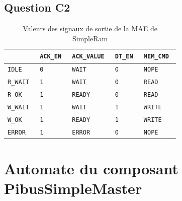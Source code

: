 \documentclass{article}
\begin{document}
\subsection{Question C2}

\begin{table}[!htb]
\centering
\begingroup
\setlength{\tabcolsep}{5pt}
\renewcommand{\arraystretch}{1.1}
\begin{tabular}{| l | l | l | l | l |}
\hline
                    & \tt{ACK\_EN}      & \tt{ACK\_VALUE}   & \tt{DT\_EN} & \tt{MEM\_CMD}   \\
\hline
\tt{IDLE}           & \tt{0}            & \tt{WAIT}         & \tt{0}      & \tt{NOPE}         \\
\tt{R\_WAIT}        & \tt{1}            & \tt{WAIT}         & \tt{0}      & \tt{READ}         \\
\tt{R\_OK}          & \tt{1}            & \tt{READY}        & \tt{0}      & \tt{READ}         \\
\tt{W\_WAIT}        & \tt{1}            & \tt{WAIT}         & \tt{1}      & \tt{WRITE}        \\
\tt{W\_OK}          & \tt{1}            & \tt{READY}        & \tt{1}      & \tt{WRITE}        \\
\tt{ERROR}          & \tt{1}            & \tt{ERROR}        & \tt{0}      & \tt{NOPE}         \\
\hline
\end{tabular}
\caption{Valeurs des signaux de sortie de la MAE de SimpleRam}
\endgroup
\end{table}







\section{Automate du composant PibusSimpleMaster}
\end{document}
